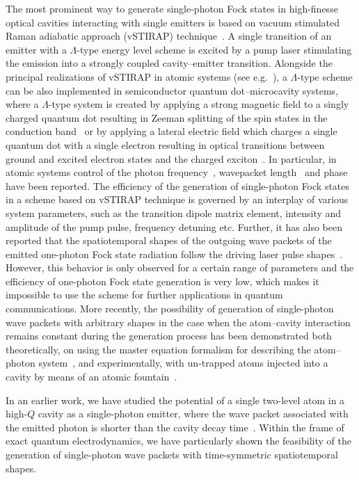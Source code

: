 \documentclass[pra, twocolumn]{revtex4}
\begin{document}
The most prominent way to generate single-photon Fock states in
high-finesse optical cavities interacting with
single emitters is based on vacuum stimulated Raman adiabatic approach
(vSTIRAP) technique~\cite{law:2067, bergmann:1003}.
A single transition of
an emitter with a $\Lambda$-type energy level scheme is excited by
a pump laser stimulating the emission into a
strongly coupled cavity--emitter transition. Alongside the
principal
realizations of vSTIRAP in atomic systems (see
e.g.~\cite{specht:469}), a $\Lambda$-type scheme can be also implemented in
semiconductor quantum dot--microcavity systems, where
a $\Lambda$-type system is created by applying
a strong magnetic field to a singly charged quantum dot resulting in
Zeeman splitting of the spin states in the conduction
band~\cite{kiraz:032305}
or by applying a lateral electric field which charges a single
quantum dot with a single electron resulting in optical transitions
between ground and excited electron states and the charged
exciton~\cite{jaritz:29}.
In particular, in atomic systems control of
the photon frequency~\cite{muecke:063805},
wavepacket
length~\cite{muecke:063805} and phase~\cite{specht:469} have been
reported.
The efficiency of the generation of single-photon Fock states in
a scheme based on vSTIRAP technique
is governed by an interplay of various system parameters,
such as the transition dipole matrix element, intensity and
amplitude of the pump pulse, frequency detuning etc.
Further, it has also been reported that the spatiotemporal shapes of
the outgoing wave packets of the emitted
one-photon Fock state radiation
follow the
driving laser pulse shapes~\cite{kuhn:067901, keller:1075}.
However, this behavior is only observed
for a certain range of parameters
and the efficiency of
one-photon Fock state generation is very low, which makes it impossible
to use the scheme for further applications in quantum
communications.
%
More recently,
the possibility of generation of single-photon wave packets
with arbitrary shapes in the case when
the atom--cavity interaction remains constant during the
generation process has been demonstrated
both theoretically, on using
the master equation formalism for describing
the atom--photon system~\cite{vasilev:063024}, and
experimentally, with un-trapped atoms injected into a cavity by means of an
atomic fountain~\cite{nisbet-jones:103036}.


In an earlier work, we have studied the potential of
a single two-level atom in a high-$Q$ cavity as a
single-photon emitter, where the wave packet
associated with the emitted photon is
shorter than the cavity decay
time~\cite{khanbekyan:013822,fidio:043822}.
Within the frame of exact quantum electrodynamics,
we have particularly shown the feasibility of
the generation of single-photon wave packets with
time-sym\-metric spatiotemporal shapes.
%
\end{document}
